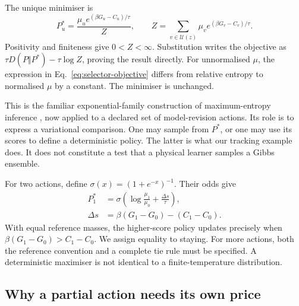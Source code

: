 The unique minimiser is
\begin{equation}
 P_u^*=\frac{\mu_u e^{(\beta G_u-C_u)/\tau}}{Z},
 \qquad Z=\sum_{v\in\mathcal U(z)}\mu_v
                      e^{(\beta G_v-C_v)/\tau}.
 \label{eq:yba-update-ensemble}
\end{equation}
Positivity and finiteness give \(0<Z<\infty\). Substitution writes the objective as
\(\tau D(P\Vert P^*)-\tau\log Z\), proving the result directly. For unnormalised \(\mu\), the expression in Eq.~\eqref{eq:selector-objective} differs from relative entropy to normalised \(\mu\) by a constant. The minimiser is unchanged.

This is the familiar exponential-family construction of maximum-entropy inference \cite{jaynes1957information}, now applied to a declared set of model-revision actions. Its role is to express a variational comparison. One may sample from \(P^*\), or one may use its scores to define a deterministic policy. The latter is what our tracking example does. It does not constitute a test that a physical learner samples a Gibbs ensemble.

For two actions, define \(\sigma(x)=(1+e^{-x})^{-1}\). Their odds give
\begin{align}
 P_1^*&=\sigma\!\left(\log\frac{\mu_1}{\mu_0}+
                                     \frac{\Delta s}{\tau}\right),\nonumber\\
 \Delta s&=\beta(G_1-G_0)-(C_1-C_0).
 \label{eq:two-action}
\end{align}
With equal reference masses, the higher-score policy updates precisely when
\(\beta(G_1-G_0)>C_1-C_0\). We assign equality to staying. For more actions, both the reference convention and a complete tie rule must be specified. A deterministic maximiser is not identical to a finite-temperature distribution.

\subsection{Why a partial action needs its own price}

